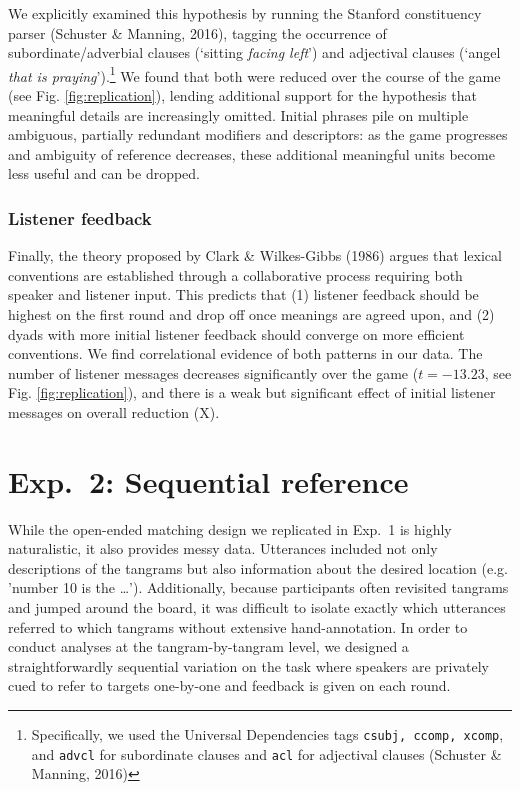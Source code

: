 \documentclass[manuscript]{stjour}
\begin{document}
We explicitly examined this hypothesis by running the Stanford
constituency parser (Schuster \& Manning, 2016), tagging the occurrence
of subordinate/adverbial clauses (`sitting \emph{facing left}') and
adjectival clauses (`angel \emph{that is praying}').\footnote{Specifically,
  we used the Universal Dependencies tags \texttt{csubj, ccomp, xcomp},
  and \texttt{advcl} for subordinate clauses and \texttt{acl} for
  adjectival clauses (Schuster \& Manning, 2016)} We found that both
were reduced over the course of the game (see Fig.
\ref{fig:replication}), lending additional support for the hypothesis
that meaningful details are increasingly omitted. Initial phrases pile
on multiple ambiguous, partially redundant modifiers and descriptors: as
the game progresses and ambiguity of reference decreases, these
additional meaningful units become less useful and can be dropped.

\subsubsection{Listener feedback}\label{listener-feedback}

Finally, the theory proposed by Clark \& Wilkes-Gibbs (1986) argues that
lexical conventions are established through a collaborative process
requiring both speaker and listener input. This predicts that (1)
listener feedback should be highest on the first round and drop off once
meanings are agreed upon, and (2) dyads with more initial listener
feedback should converge on more efficient conventions. We find
correlational evidence of both patterns in our data. The number of
listener messages decreases significantly over the game (\(t = -13.23\),
see Fig. \ref{fig:replication}), and there is a weak but significant
effect of initial listener messages on overall reduction (X).


\section{Exp.~2: Sequential reference}\label{task2}

While the open-ended matching design we replicated in Exp.~1 is highly naturalistic, it also provides messy data. Utterances included not only descriptions of the tangrams but also information about the desired location (e.g. 'number 10 is the \dots'). Additionally, because participants often revisited tangrams and jumped around the board, it was difficult to isolate exactly which utterances referred to which tangrams without extensive hand-annotation. In order to conduct analyses at the tangram-by-tangram level, we designed a straightforwardly sequential variation on the task where speakers are privately cued to refer to targets one-by-one and feedback is given on each round. 
\end{document}
